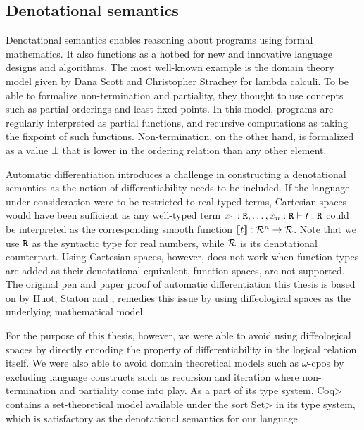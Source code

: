 \subsection{Denotational semantics}
Denotational semantics enables reasoning about programs using formal mathematics.
It also functions as a hotbed for new and innovative language designs and algorithms.
The most well-known example is the domain theory model given by Dana Scott and Christopher Strachey\cite{Scott1977} for lambda calculi.
To be able to formalize non-termination and partiality, they thought to use concepts such as partial orderings and least fixed points\cite{aaby2020}.
In this model, programs are regularly interpreted as partial functions, and recursive computations as taking the fixpoint of such functions.
Non-termination, on the other hand, is formalized as a value $\bot$ that is lower in the ordering relation than any other element.

Automatic differentiation introduces a challenge in constructing a denotational semantics as the notion of differentiability needs to be included.
If the language under consideration were to be restricted to real-typed terms, Cartesian spaces would have been sufficient as any well-typed term $x_1 : \texttt{R}, \dots, x_n : \texttt{R} \vdash t : \texttt{R}$ could be interpreted as the corresponding smooth function $\llbracket t \rrbracket : \mathcal{R}^n \to \mathcal{R}$.
Note that we use $\texttt{R}$ as the syntactic type for real numbers, while $\mathcal{R}$ is its denotational counterpart.
Using Cartesian spaces, however, does not work when function types are added as their denotational equivalent, function spaces, are not supported\cite{huot2020correctness}.
The original pen and paper proof of automatic differentiation this thesis is based on by Huot, Staton and \Vakar{}\cite{huot2020correctness}, remedies this issue by using diffeological spaces as the underlying mathematical model.

For the purpose of this thesis, however, we were able to avoid using diffeological spaces by directly encoding the property of differentiability in the logical relation itself.
We were also able to avoid domain theoretical models such as $\omega$-cpos by excluding language constructs such as recursion and iteration where non-termination and partiality come into play.
As a part of its type system, \<Coq> contains a set-theoretical model available under the sort \<Set> in its type system, which is satisfactory as the denotational semantics for our language.

